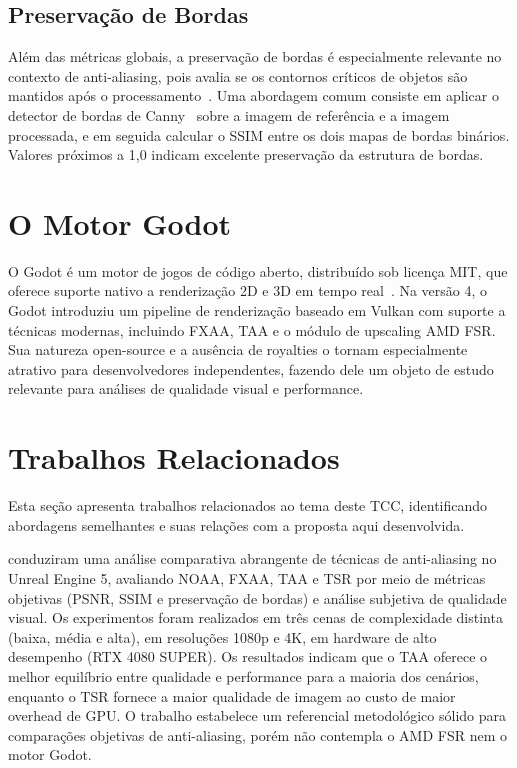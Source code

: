 \documentclass[twoside,english,brazilian]{UNISINOSmonografia}
\begin{document}
\subsection{Preservação de Bordas}

Além das métricas globais, a preservação de bordas é especialmente relevante no contexto de anti-aliasing, pois avalia se os contornos críticos de objetos são mantidos após o processamento~\cite{feng2025antialiasing}. Uma abordagem comum consiste em aplicar o detector de bordas de Canny~\cite{canny1986edge} sobre a imagem de referência e a imagem processada, e em seguida calcular o SSIM entre os dois mapas de bordas binários. Valores próximos a 1,0 indicam excelente preservação da estrutura de bordas.

\section{O Motor Godot}

O Godot é um motor de jogos de código aberto, distribuído sob licença MIT, que oferece suporte nativo a renderização 2D e 3D em tempo real~\cite{godot_engine}. Na versão 4, o Godot introduziu um pipeline de renderização baseado em Vulkan com suporte a técnicas modernas, incluindo FXAA, TAA e o módulo de upscaling AMD FSR. Sua natureza open-source e a ausência de royalties o tornam especialmente atrativo para desenvolvedores independentes, fazendo dele um objeto de estudo relevante para análises de qualidade visual e performance.

\section{Trabalhos Relacionados}

Esta seção apresenta trabalhos relacionados ao tema deste TCC, identificando abordagens semelhantes e suas relações com a proposta aqui desenvolvida.

 conduziram uma análise comparativa abrangente de técnicas de anti-aliasing no Unreal Engine 5, avaliando NOAA, FXAA, TAA e TSR por meio de métricas objetivas (PSNR, SSIM e preservação de bordas) e análise subjetiva de qualidade visual. Os experimentos foram realizados em três cenas de complexidade distinta (baixa, média e alta), em resoluções 1080p e 4K, em hardware de alto desempenho (RTX 4080 SUPER). Os resultados indicam que o TAA oferece o melhor equilíbrio entre qualidade e performance para a maioria dos cenários, enquanto o TSR fornece a maior qualidade de imagem ao custo de maior overhead de GPU. O trabalho estabelece um referencial metodológico sólido para comparações objetivas de anti-aliasing, porém não contempla o AMD FSR nem o motor Godot.
\end{document}
